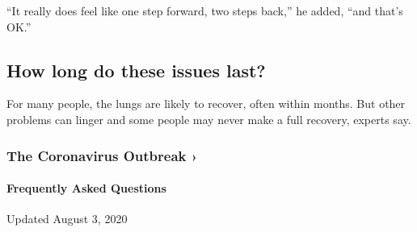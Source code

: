 ``It really does feel like one step forward, two steps back,'' he added,
``and that's OK.''

\hypertarget{how-long-do-these-issues-last}{%
\subsection{How long do these issues
last?}\label{how-long-do-these-issues-last}}

For many people, the lungs are likely to recover, often within months.
But other problems can linger and some people may never make a full
recovery, experts say.

\href{https://www.nytimes3xbfgragh.onion/news-event/coronavirus?action=click\&pgtype=Article\&state=default\&region=MAIN_CONTENT_3\&context=storylines_faq}{}

\hypertarget{the-coronavirus-outbreak-}{%
\subsubsection{The Coronavirus Outbreak
›}\label{the-coronavirus-outbreak-}}

\hypertarget{frequently-asked-questions}{%
\paragraph{Frequently Asked
Questions}\label{frequently-asked-questions}}

Updated August 3, 2020


